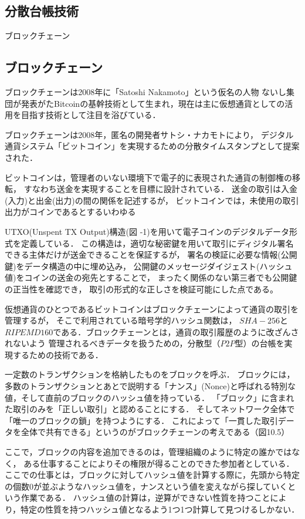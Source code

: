 \documentclass[a4paper,12pt]{jsarticle}
\begin{document}
      \subsection{分散台帳技術}
ブロックチェーン

      \subsection{ブロックチェーン}

ブロックチェーンは2008年に「Satoshi Nakamoto」という仮名の人物
ないし集団が発表がたBitcoinの基幹技術として生まれ，現在は主に仮想通貨としての活用を目指す技術として注目を浴びている．

ブロックチェーンは2008年，匿名の開発者サトシ・ナカモトにより，
デジタル通貨システム「ビットコイン」を実現するための分散タイムスタンプとして提案された．

ビットコインは，管理者のいない環境下で電子的に表現された通貨の制御権の移転，
すなわち送金を実現することを目標に設計されている．
送金の取引は入金(入力)と出金(出力)の間の関係を記述するが，
ビットコインでは，未使用の取引出力がコインであるとするいわゆる

UTXO(Unspent TX Output)構造(図 -1)を用いて電子コインのデジタルデータ形式を定義している．
この構造は，適切な秘密鍵を用いて取引にディジタル署名できる主体だけが送金できることを保証するが，
署名の検証に必要な情報(公開鍵)をデータ構造の中に埋め込み，
公開鍵のメッセージダイジェスト(ハッシュ値)をコインの送金の宛先とすることで，
まったく関係のない第三者でも公開鍵の正当性を確認でき，
取引の形式的な正しさを検証可能にした点である。

仮想通貨のひとつであるビットコインはブロックチェーンによって通貨の取引を管理するが，
そこで利用されている暗号学的ハッシュ関数は，
$SHA-256$と$RIPEMD160$である．ブロックチェーンとは，通貨の取引履歴のように改ざんされないよう
管理されるべきデータを扱うための，分散型（$P2P$型）の台帳を実現するための技術である．

一定数のトランザクションを格納したものをブロックを呼ぶ．
ブロックには，多数のトランザクションとあとで説明する「ナンス」(Nonce)と呼ばれる特別な値，そして直前のブロックのハッシュ値を持っている．
「ブロック」に含まれた取引のみを「正しい取引」と認めることにする．
そしてネットワーク全体で「唯一のブロックの鎖」を持つようにする．
これによって「一貫した取引データを全体で共有できる」というのがブロックチェーンの考えである（図10.5）


ここで，ブロックの内容を追加できるのは，管理組織のように特定の誰かではなく，
ある仕事することによりその権限が得ることのできた参加者としている．
ここでの仕事とは，ブロックに対してハッシュ値を計算する際に，先頭から特定の個数$0$が並ぶようなハッシュ値を，ナンスという値を変えながら探していくという作業である．
ハッシュ値の計算は，逆算ができない性質を持つことにより，特定の性質を持つハッシュ値となるよう1つ1つ計算して見つけるしかない．
\end{document}
